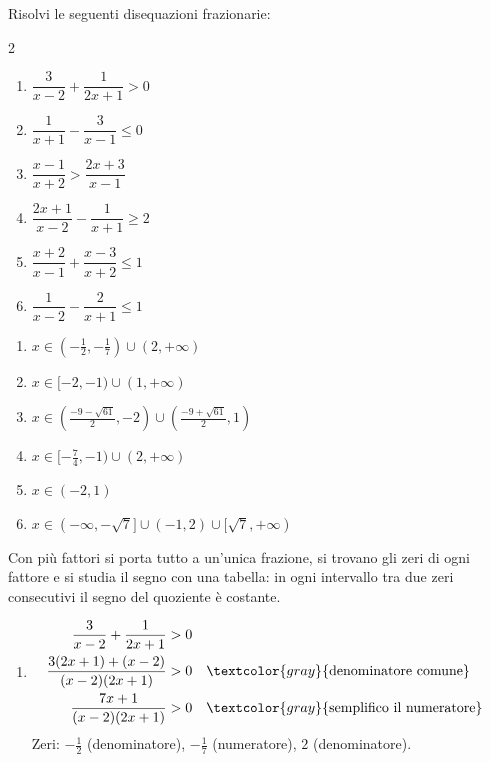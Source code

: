 \begin{question}[ID=2.4, subtitle={Disequazioni frazionarie con più fattori}, difficulty=difficile, tags={disequazioni frazionarie}]
Risolvi le seguenti disequazioni frazionarie:
\begin{multicols}{2}
\begin{enumerate}[leftmargin=3.2cm]
    \item $\dfrac{3}{x-2}+\dfrac{1}{2x+1}>0$
    \item $\dfrac{1}{x+1}-\dfrac{3}{x-1}\leq 0$
    \item $\dfrac{x-1}{x+2}>\dfrac{2x+3}{x-1}$
    \item $\dfrac{2x+1}{x-2}-\dfrac{1}{x+1}\geq 2$
    \item $\dfrac{x+2}{x-1}+\dfrac{x-3}{x+2}\leq 1$
    \item $\dfrac{1}{x-2}-\dfrac{2}{x+1}\leq 1$
\end{enumerate}
\end{multicols}
\begin{solution}
\begin{enumerate}
    \item $x\in(-\tfrac12,-\tfrac17)\cup(2,+\infty)$
    \item $x\in[-2,-1)\cup(1,+\infty)$
    \item $x\in\left(\tfrac{-9-\sqrt{61}}{2},-2\right)\cup\left(\tfrac{-9+\sqrt{61}}{2},1\right)$
    \item $x\in[-\tfrac74,-1)\cup(2,+\infty)$
    \item $x\in(-2,1)$
    \item $x\in(-\infty,-\sqrt7]\cup(-1,2)\cup[\sqrt7,+\infty)$
\end{enumerate}
\end{solution}
\begin{explanation}
Con più fattori si porta tutto a un'unica frazione, si trovano gli zeri di ogni fattore e si studia il segno con una tabella: in ogni intervallo tra due zeri consecutivi il segno del quoziente è costante.
\begin{enumerate}
    \item \[\begin{aligned}
    \dfrac{3}{x-2}+\dfrac{1}{2x+1} &> 0\\
    \dfrac{3(2x+1)+(x-2)}{(x-2)(2x+1)} &> 0 && \textcolor{gray}{\text{denominatore comune}}\\
    \dfrac{7x+1}{(x-2)(2x+1)} &> 0 && \textcolor{gray}{\text{semplifico il numeratore}}
    \end{aligned}\]
    Zeri: $-\tfrac12$ (denominatore), $-\tfrac17$ (numeratore), $2$ (denominatore). \\

\end{enumerate}
\end{explanation}
\end{question}
